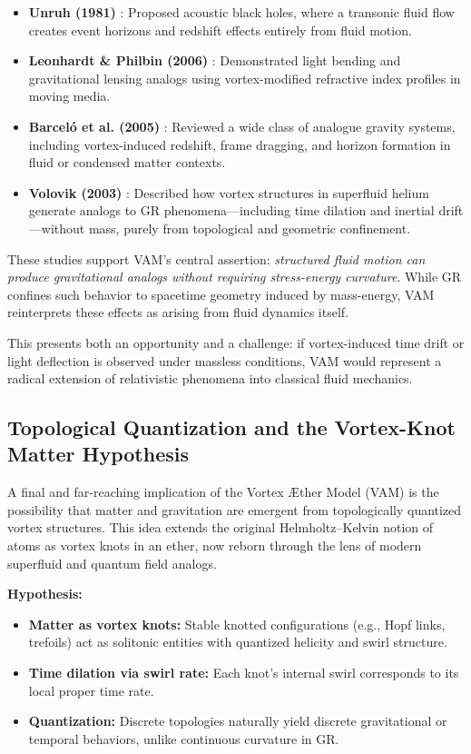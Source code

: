 \begin{itemize}
    \item \textbf{Unruh (1981)} \cite{unruh1981}: Proposed acoustic black holes, where a transonic fluid flow creates event horizons and redshift effects entirely from fluid motion.

    \item \textbf{Leonhardt \& Philbin (2006)} \cite{leonhardt2006}: Demonstrated light bending and gravitational lensing analogs using vortex-modified refractive index profiles in moving media.

    \item \textbf{Barceló et al. (2005)} \cite{barcelo2005}: Reviewed a wide class of analogue gravity systems, including vortex-induced redshift, frame dragging, and horizon formation in fluid or condensed matter contexts.

    \item \textbf{Volovik (2003)} \cite{volovik2003}: Described how vortex structures in superfluid helium generate analogs to GR phenomena---including time dilation and inertial drift---without mass, purely from topological and geometric confinement.
\end{itemize}

These studies support VAM's central assertion: \emph{structured fluid motion can produce gravitational analogs without requiring stress-energy curvature}. While GR confines such behavior to spacetime geometry induced by mass-energy, VAM reinterprets these effects as arising from fluid dynamics itself.

This presents both an opportunity and a challenge: if vortex-induced time drift or light deflection is observed under massless conditions, VAM would represent a radical extension of relativistic phenomena into classical fluid mechanics.

\subsection{Topological Quantization and the Vortex-Knot Matter Hypothesis}

A final and far-reaching implication of the Vortex Æther Model (VAM) is the possibility that matter and gravitation are emergent from topologically quantized vortex structures. This idea extends the original Helmholtz–Kelvin notion of atoms as vortex knots in an ether, now reborn through the lens of modern superfluid and quantum field analogs.

\textbf{Hypothesis:}
\begin{itemize}
    \item \textbf{Matter as vortex knots:} Stable knotted configurations (e.g., Hopf links, trefoils) act as solitonic entities with quantized helicity and swirl structure.
    \item \textbf{Time dilation via swirl rate:} Each knot's internal swirl corresponds to its local proper time rate.
    \item \textbf{Quantization:} Discrete topologies naturally yield discrete gravitational or temporal behaviors, unlike continuous curvature in GR.
\end{itemize}

